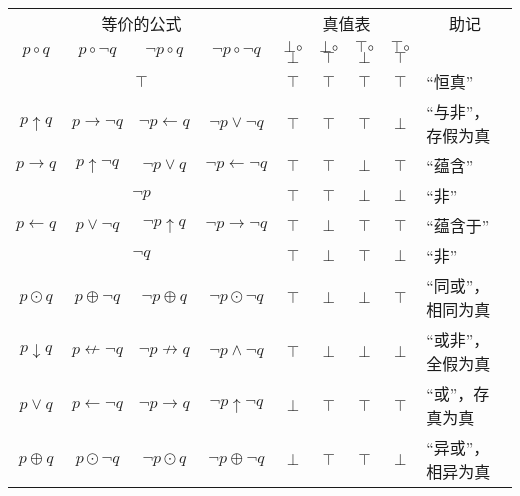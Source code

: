 \begin{table}[h!]
    \centering
    \newcommand{\F}{{\color{red}$\bot$}}
    \newcommand{\T}{{\color{blue}$\top$}}
    \newcommand{\FoF}{\F$\circ$\F}
    \newcommand{\FoT}{\F$\circ$\T}
    \newcommand{\ToF}{\T$\circ$\F}
    \newcommand{\ToT}{\T$\circ$\T}
    \begin{tabular}{c c c c c c c c l}
        \hline
        \multicolumn{4}{c}{等价的公式} & \multicolumn{4}{c}{真值表} & \multicolumn{1}{c}{助记} \\
        $p\circ{}q$      & $p\circ\lnot{}q$      & $\lnot{}p\circ{}q$      & $\lnot{}p\circ\lnot{}q$      & \FoF & \FoT & \ToF & \ToT &                    \\
        \hline
        \multicolumn{4}{c}{$\top$}                                                                        & \T   & \T   & \T   & \T   & ``恒真''           \\
        $p\uparrow{}q$   & $p\to\lnot{}q$        & $\lnot{}p\gets{}q$      & $\lnot{}p\lor\lnot{}q$       & \T   & \T   & \T   & \F   & ``与非''，存假为真 \\
        $p\to{}q$        & $p\uparrow\lnot{}q$   & $\lnot{}p\lor{}q$       & $\lnot{}p\gets\lnot{}q$      & \T   & \T   & \F   & \T   & ``蕴含''           \\
        \multicolumn{4}{c}{$\lnot{}p$}                                                                    & \T   & \T   & \F   & \F   & ``非''             \\
        $p\gets{}q$      & $p\lor\lnot{}q$       & $\lnot{}p\uparrow{}q$   & $\lnot{}p\to\lnot{}q$        & \T   & \F   & \T   & \T   & ``蕴含于''         \\
        \multicolumn{4}{c}{$\lnot{}q$}                                                                    & \T   & \F   & \T   & \F   & ``非''             \\
        $p\odot{}q$      & $p\oplus\lnot{}q$     & $\lnot{}p\oplus{}q$     & $\lnot{}p\odot\lnot{}q$      & \T   & \F   & \F   & \T   & ``同或''，相同为真 \\
        $p\downarrow{}q$ & $p\not\gets\lnot{}q$  & $\lnot{}p\not\to{}q$    & $\lnot{}p\land\lnot{}q$      & \T   & \F   & \F   & \F   & ``或非''，全假为真 \\
        $p\lor{}q$       & $p\gets\lnot{}q$      & $\lnot{}p\to{}q$        & $\lnot{}p\uparrow\lnot{}q$   & \F   & \T   & \T   & \T   & ``或''，存真为真   \\
        $p\oplus{}q$     & $p\odot\lnot{}q$      & $\lnot{}p\odot{}q$      & $\lnot{}p\oplus\lnot{}q$     & \F   & \T   & \T   & \F   & ``异或''，相异为真 \\

\end{tabular}
\end{table}
